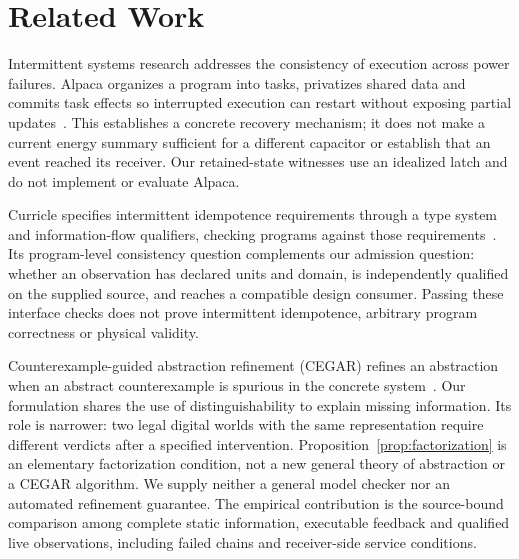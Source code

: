 \section{Related Work}
Intermittent systems research addresses the consistency of execution across
power failures. Alpaca organizes a program into tasks, privatizes shared data
and commits task effects so interrupted execution can restart without exposing
partial updates~\cite{alpaca}. This establishes a concrete recovery mechanism;
it does not make a current energy summary sufficient for a different capacitor
or establish that an event reached its receiver. Our retained-state witnesses
use an idealized latch and do not implement or evaluate Alpaca.

Curricle specifies intermittent idempotence requirements through a type system
and information-flow qualifiers, checking programs against those
requirements~\cite{curricle}. Its program-level consistency question complements
our admission question: whether an observation has declared units and domain,
is independently qualified on the supplied source, and reaches a compatible
design consumer. Passing these interface checks does not prove intermittent
idempotence, arbitrary program correctness or physical validity.

Counterexample-guided abstraction refinement (CEGAR) refines an abstraction
when an abstract counterexample is spurious in the concrete
system~\cite{cegar}. Our formulation shares the use of distinguishability to
explain missing information. Its role is narrower: two legal digital worlds
with the same representation require different verdicts after a specified
intervention. Proposition~\ref{prop:factorization} is an elementary
factorization condition, not a new general theory of abstraction or a CEGAR
algorithm. We supply neither a general model checker nor an automated
refinement guarantee. The empirical contribution is the source-bound
comparison among complete static information, executable feedback and
qualified live observations, including failed chains and receiver-side
service conditions.
